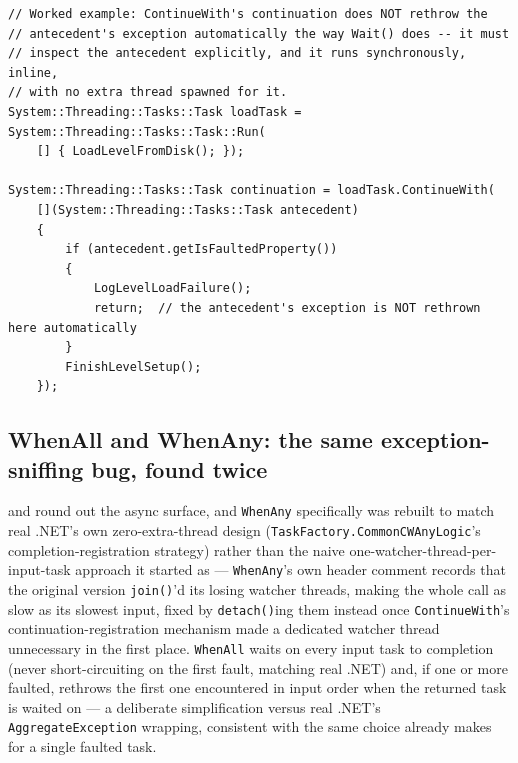 \begin{lstlisting}
// Worked example: ContinueWith's continuation does NOT rethrow the
// antecedent's exception automatically the way Wait() does -- it must
// inspect the antecedent explicitly, and it runs synchronously, inline,
// with no extra thread spawned for it.
System::Threading::Tasks::Task loadTask = System::Threading::Tasks::Task::Run(
    [] { LoadLevelFromDisk(); });

System::Threading::Tasks::Task continuation = loadTask.ContinueWith(
    [](System::Threading::Tasks::Task antecedent)
    {
        if (antecedent.getIsFaultedProperty())
        {
            LogLevelLoadFailure();
            return;  // the antecedent's exception is NOT rethrown here automatically
        }
        FinishLevelSetup();
    });
\end{lstlisting}

\subsection{WhenAll and WhenAny: the same exception-sniffing bug, found twice}

 and  round out the async surface, and
\texttt{WhenAny} specifically was rebuilt to match real .NET's own zero-extra-thread design
(\texttt{TaskFactory.CommonCWAnyLogic}'s completion-registration strategy) rather than the
naive one-watcher-thread-per-input-task approach it started as --- \texttt{WhenAny}'s own
header comment records that the original version \texttt{join()}'d its losing watcher threads,
making the whole call as slow as its slowest input, fixed by \texttt{detach()}ing them instead
once \texttt{ContinueWith}'s continuation-registration mechanism made a dedicated watcher
thread unnecessary in the first place. \texttt{WhenAll} waits on every input task to completion
(never short-circuiting on the first fault, matching real .NET) and, if one or more faulted,
rethrows the first one encountered in input order when the returned task is waited on --- a
deliberate simplification versus real .NET's \texttt{AggregateException} wrapping, consistent
with the same choice  already makes for a single faulted task.

